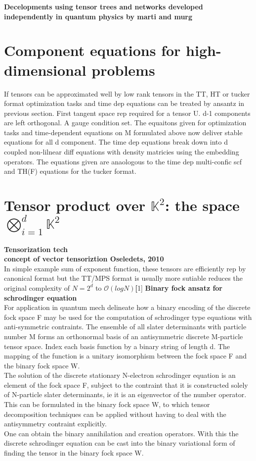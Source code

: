\documentclass[10pt, draft]{article}
\begin{document}
\textbf{Decelopments using tensor trees and networks developed independently in quantum physics by marti and murg}

\section{Component equations for high-dimensional problems}
If tensors can be approximated well by low rank tensors in the TT, HT or tucker format optimization tasks and time dep equations can be treated by ansantz in previous section.  First tangent space rep required for a tensor U.  d-1 components are left orthogonal.  A gauge condition set.  The equaitons given for optimization tasks and time-dependent equations on M formulated above now deliver stable equations for all d component.  The time dep equations break down into d coupled non-lilnear diff equations with density matricies using the embedding operators.  The equations given are anaologous to the time dep multi-confic scf and TH(F) equations for the tucker format.

\section{Tensor product over $\mathbb{K}^2$: the space $\bigotimes_{i=1}^d \mathbb{K}^2$}
\textbf{Tensorization tech} \\
\textbf{concept of vector tensoriztion Oseledets, 2010}\\
In simple example sum of exponent function, these tensors are efficiently rep by canonical format but the TT/MPS format is usually more sutiable reduces the original complexity of $N=2^d$ to $\mathcal{O}(logN)$\textbf[1]
\textbf{Binary fock ansatz for schrodinger equation}\\
For application in quantum mech delineate how a binary encoding of the discrete fock space F may be used for the computation of schrodinger type equations with anti-symmetric contraints. The ensemble of all slater determinants with particle number M forms an orthonormal basis of an antisymmetric discrete M-particle tensor space. Index each basis function by a binary string of length d.  The mapping of the function is a unitary isomorphism between the fock space F and the binary fock space W.  \\
The solution of the discrete stationary N-electron schrodinger equation is an element of the fock space F, subject to the contraint that it is constructed solely of N-particle slater determinants, ie it is an eigenvector of the number operator. This can be formulated in the binary fock space W, to which tensor decomposition techniques can be applied without having to deal with the antisymmetry contraint explicitly. \\
One can obtain the binary annihilation and creation operators.  With this the discrete schrodinger equation can be cast into the binary variational form of finding the tensor in the binary fock space W.\\
\end{document}

